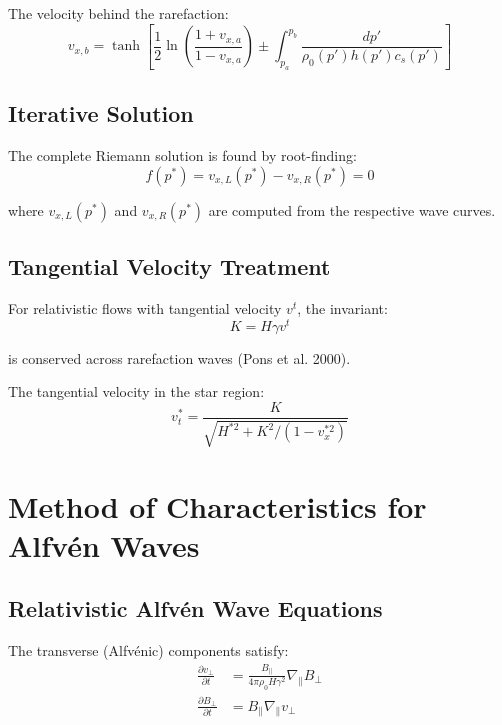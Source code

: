 \documentclass[12pt,a4paper]{article}
\begin{document}
The velocity behind the rarefaction:
\begin{equation}
v_{x,b} = \tanh\left[\frac{1}{2}\ln\left(\frac{1+v_{x,a}}{1-v_{x,a}}\right)
\pm \int_{p_a}^{p_b} \frac{dp'}{\rho_0(p') h(p') c_s(p')}\right]
\label{eq:rarefaction_velocity}
\end{equation}

\subsection{Iterative Solution}

The complete Riemann solution is found by root-finding:
\begin{equation}
f(p^*) = v_{x,L}(p^*) - v_{x,R}(p^*) = 0
\label{eq:root_finding}
\end{equation}

where $v_{x,L}(p^*)$ and $v_{x,R}(p^*)$ are computed from the respective wave curves.

\subsection{Tangential Velocity Treatment}

For relativistic flows with tangential velocity $v^t$, the invariant:
\begin{equation}
K = H \gamma v^t
\label{eq:tangent_invariant}
\end{equation}

is conserved across rarefaction waves (Pons et al. 2000).

The tangential velocity in the star region:
\begin{equation}
v_t^* = \frac{K}{\sqrt{H^{*2} + K^2/(1 - v_x^{*2})}}
\label{eq:tangent_star}
\end{equation}

\section{Method of Characteristics for Alfv\'en Waves}

\subsection{Relativistic Alfv\'en Wave Equations}

The transverse (Alfv\'enic) components satisfy:
\begin{align}
\frac{\partial v_\perp}{\partial t} &= \frac{B_\parallel}{4\pi \rho_0 H \gamma^2} \nabla_\parallel B_\perp \\
\frac{\partial B_\perp}{\partial t} &= B_\parallel \nabla_\parallel v_\perp
\end{align}
\end{document}
